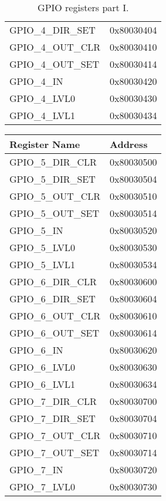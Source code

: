 \begin{table}[h]
{\begin{small}
\begin{center}
\begin{tabular}{l | l}
GPIO\_4\_DIR\_SET    & 0x80030404\\
GPIO\_4\_OUT\_CLR    & 0x80030410\\
GPIO\_4\_OUT\_SET    & 0x80030414\\
GPIO\_4\_IN         & 0x80030420\\
GPIO\_4\_LVL0       & 0x80030430\\
GPIO\_4\_LVL1       & 0x80030434\\
	\end{tabular}
\end{center}
\end{small}
}
\caption{GPIO registers part I.}
\label{register_map_3}
\end{table}

\vspace{-0.2in}
\begin{table}[h]
	{
		\begin{small}
			\begin{center}
				\begin{tabular}{l | l}
					Register Name & Address\\ \hline \hline
GPIO\_5\_DIR\_CLR    & 0x80030500\\
GPIO\_5\_DIR\_SET    & 0x80030504\\
GPIO\_5\_OUT\_CLR    & 0x80030510\\
GPIO\_5\_OUT\_SET    & 0x80030514\\
GPIO\_5\_IN         & 0x80030520\\
GPIO\_5\_LVL0       & 0x80030530\\
GPIO\_5\_LVL1       & 0x80030534\\
GPIO\_6\_DIR\_CLR    & 0x80030600\\
GPIO\_6\_DIR\_SET    & 0x80030604\\
GPIO\_6\_OUT\_CLR    & 0x80030610\\
GPIO\_6\_OUT\_SET    & 0x80030614\\
GPIO\_6\_IN         & 0x80030620\\
GPIO\_6\_LVL0       & 0x80030630\\
GPIO\_6\_LVL1       & 0x80030634\\
GPIO\_7\_DIR\_CLR    & 0x80030700\\
GPIO\_7\_DIR\_SET    & 0x80030704\\
GPIO\_7\_OUT\_CLR    & 0x80030710\\
GPIO\_7\_OUT\_SET    & 0x80030714\\
GPIO\_7\_IN         & 0x80030720\\
GPIO\_7\_LVL0       & 0x80030730\\

\end{tabular}
\end{center}
\end{small}}
\end{table}
